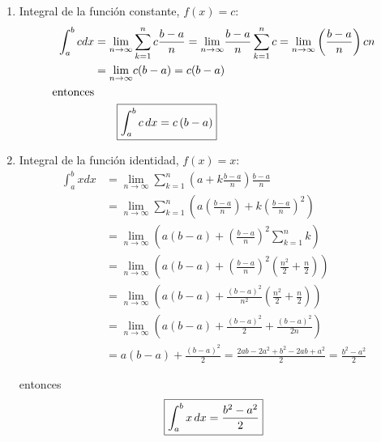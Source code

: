 \begin{enumerate}[leftmargin=1.2em,   itemindent=0pt,       labelwidth=\labelwidth,labelsep=0.5em,]
 \item { \textnormal{Integral de la función constante}}, $f(x)=c$:
{\small
\begin{align}\label{c}
\int_{a}^{b}cdx&=\underset{n\rightarrow \infty }{\lim }\sum\limits_{k=1}^{n}c\frac{b-a}{n}=\underset{n\rightarrow \infty }{\lim }\frac{b-a}{n}\sum\limits_{k=1}^{n}c=\underset{n\rightarrow \infty }{\lim }\left( \frac{b-a}{n}\right) cn\notag\\
&=\underset{n\rightarrow \infty }{\lim }c(b-a)=c(b-a)
\\\text{entonces}
\notag\\
&\qquad\text{\fbox{$\displaystyle{\int_{a}^{b} c\, dx=c\left( b-a\right)}$}}
\end{align}
}

\item { \textnormal{Integral de la función identidad,}} $f(x)=x$:
{\small
\begin{align*}
\int_{a}^{b}xdx &= \underset{n\rightarrow \infty }{\lim }\sum\limits_{k=1}^{n}\left( a+k\frac{b-a}{n}\right) \frac{b-a}{n} \\
&=\underset{n\rightarrow \infty }{\lim }\sum\limits_{k=1}^{n}\left( a\left( \frac{b-a}{n}\right) +k\left( \frac{b-a}{n}\right) ^{2} \right) \\
&=\underset{n\rightarrow \infty }{\lim }\left( a\left( b-a\right) + \left( \frac{b-a}{n}\right)^{2}\sum\limits_{k=1}^{n}k \right) \\
&=\underset{n\rightarrow \infty }{\lim }\left( a\left( b-a\right) + \left( \frac{b-a}{n}\right) ^{2}\left( \frac{n^{2}}{2}+\frac{n}{2}\right) \right) \\
&=\underset{n\rightarrow \infty }{\lim }\left( a\left( b-a\right) + \frac{\left( b-a\right) ^{2}}{n^{2}}\left( \frac{n^{2}}{2}+\frac{n}{2}\right) \right) \\
&=\underset{n\rightarrow \infty }{\lim }\left( a\left( b-a\right) + \frac{\left( b-a\right) ^{2}}{2} + \frac{\left( b-a\right) ^{2}}{2n} \right) \\
&= a\left( b-a\right) + \frac{\left( b-a\right) ^{2}}{2} = \frac{2ab-2a^{2}+b^{2}-2ab+a^{2}}{2} = \frac{b^{2}-a^{2}}{2}
\end{align*}
}

entonces
{\small
\begin{equation}\label{x}
\text{\fbox{$\displaystyle{\int_{a}^{b}x\, dx=\frac{b^{2}-a^{2}}{2}}$}}
\end{equation}
}


\end{enumerate}
